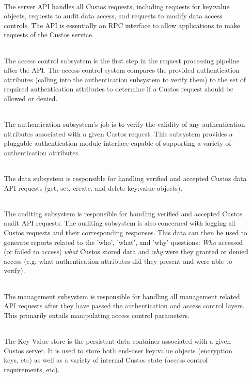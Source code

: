 \begin{packed_desc}
\item[API] \hfill \\ The server API handles all Custos requests,
  including requests for key:value objects, requests to audit data
  access, and requests to modify data access controls. The API is
  essentially an RPC interface to allow applications to make requests
  of the Custos service.
\item[Access Control Subsystem] \hfill \\ The access control subsystem
  is the first step in the request processing pipeline after the
  API. The access control system compares the provided authentication
  attributes (calling into the authentication subsystem to verify
  them) to the set of required authentication attributes to determine
  if a Custos request should be allowed or denied.
\item[Authentication Subsystem] \hfill \\ The authentication
  subsystem's job is to verify the validity of any authentication
  attributes associated with a given Custos request. This subsystem
  provides a pluggable authentication module interface capable of
  supporting a variety of authentication attributes.
\item[Data Subsystem] \hfill \\ The data subsystem is responsible for
  handling verified and accepted Custos data API requests (get, set,
  create, and delete key:value objects).
\item[Auditing Subsystem] \hfill \\ The auditing subsystem is
  responsible for handling verified and accepted Custos audit API
  requests. The auditing subsystem is also concerned with logging all
  Custos requests and their corresponding responses. This data can
  then be used to generate reports related to the 'who', 'what', and
  'why' questions: \emph{Who} accessed (or failed to access)
  \emph{what} Custos stored data and \emph{why} were they granted or
  denied access (e.g. what authentication attributes did they present
  and were able to verify).
\item[Management Subsystem] \hfill \\ The management subsystem is
  responsible for handling all management related API requests after
  they have passed the authentication and access control layers. This
  primarily entails manipulating access control parameters.
\item[Key:Value Store] \hfill \\ The Key-Value store is the persistent
  data container associated with a given Custos server. It is used to
  store both end-user key:value objects (encryption keys, etc) as well
  as a variety of internal Custos state (access control requirements,
  etc).
\end{packed_desc}

